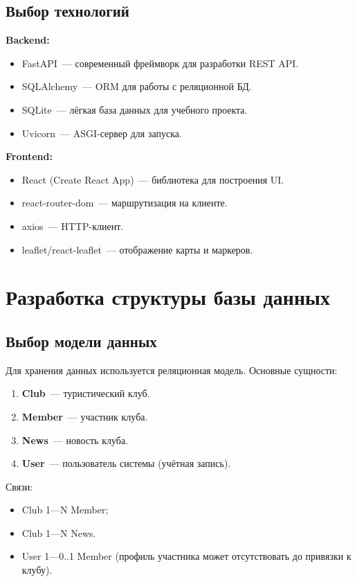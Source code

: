 \documentclass[utf8, russian]{eskdtext}
\let\stdsection\section
\renewcommand \section{\newpage\stdsection}
\begin{document}
\subsection{Выбор технологий}
\textbf{Backend:}
\begin{itemize}
  \item FastAPI~--- современный фреймворк для разработки REST API.
  \item SQLAlchemy~--- ORM для работы с реляционной БД.
  \item SQLite~--- лёгкая база данных для учебного проекта.
  \item Uvicorn~--- ASGI-сервер для запуска.
\end{itemize}

\textbf{Frontend:}
\begin{itemize}
  \item React (Create React App)~--- библиотека для построения UI.
  \item react-router-dom~--- маршрутизация на клиенте.
  \item axios~--- HTTP-клиент.
  \item leaflet/react-leaflet~--- отображение карты и маркеров.
\end{itemize}

\section{Разработка структуры базы данных}
\subsection{Выбор модели данных}
Для хранения данных используется реляционная модель. Основные сущности:
\begin{enumerate}
  \item \textbf{Club}~--- туристический клуб.
  \item \textbf{Member}~--- участник клуба.
  \item \textbf{News}~--- новость клуба.
  \item \textbf{User}~--- пользователь системы (учётная запись).
\end{enumerate}

Связи:
\begin{itemize}
  \item Club 1---N Member;
  \item Club 1---N News.
  \item User 1---0..1 Member (профиль участника может отсутствовать до привязки к клубу).
\end{itemize}
\end{document}
